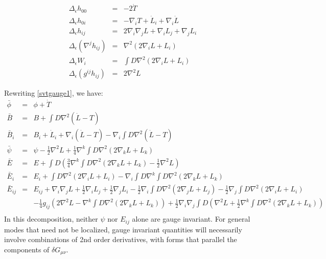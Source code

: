 \documentclass[10pt,letterpaper]{article}
\numberwithin{equation}{section}
\begin{document}
\begin{eqnarray}
\Delta_\epsilon h_{00} &=& -2\dot T
\nonumber\\
\Delta_\epsilon h_{0i} &=& -\nabla_i T + \dot L_i + \nabla_i \dot L
\nonumber\\
\Delta_\epsilon h_{ij} &=& 2\nabla_i\nabla_j L + \nabla_i L_j + \nabla_j L_i 
\nonumber\\
\Delta_\epsilon (\nabla^j h_{ij})&=& \nabla^2(2 \nabla_i L + L_i)
\nonumber\\
\Delta_\epsilon W_i &=& \int D \nabla^2 (2\nabla_i L + L_i)
\nonumber\\
\Delta_\epsilon (g^{ij}h_{ij}) &=& 2\nabla^2 L
\end{eqnarray}

Rewriting \eqref{svtgauge1}, we have:
\begin{eqnarray}
\bar\phi &=& \phi+ \dot T
\label{phisvt}
\\
\bar B &=& B + \int D \nabla^2(\dot L-T)
\\
\label{Bsvt}
\bar B_i &=& B_i + \dot L_i + \nabla_i (\dot L-T) - \nabla_i \int D \nabla^2(\dot L-T)
\\
\label{Bisvt}
\bar\psi&=& \psi -\tfrac12 \nabla^2 L+\tfrac14 \nabla^k \int D \nabla^2 (2\nabla_k L + L_k)
\\
\label{psisvt}
\bar E&=& E + \int D\left(\tfrac34 \nabla^k \int D\nabla^2(2\nabla_k L + L_k) -\tfrac12 \nabla^2 L\right)
\\
\label{Esvt}
\bar E_i &=& E_i + \int D\nabla^2 (2 \nabla_i L + L_i) - \nabla_i \int D \nabla^k \int D\nabla^2 (2 \nabla_k L + L_k)
\\
\label{Eisvt}
\bar E_{ij} &=& E_{ij} +\nabla_i \nabla_j L + \tfrac12\nabla_i L_j+ \tfrac12\nabla_j L_i
-\tfrac12\nabla_i \int D\nabla^2 (2\nabla_j L + L_j) - \tfrac12\nabla_j \int D \nabla^2 (2\nabla_i L + L_i)
\nonumber\\
&&-\tfrac14 g_{ij}\left( 2 \nabla^2 L - \nabla^k \int D \nabla^2( 2\nabla_k L + L_k)\right)
+ \tfrac12 \nabla_i \nabla_j \int D \left( \nabla^2 L +\tfrac12 \nabla^k \int D \nabla^2 (2\nabla_k L +L_k)\right)
\nonumber\\
\label{Etsvt}
\end{eqnarray}
In this decomposition, neither $\psi$ nor $E_{ij}$ alone are gauge invariant. For general modes that need not be localized, gauge invariant quantities will necessarily involve combinations of 2nd order derivatives, with forms that parallel the components of $\delta G_{\mu\nu}$. 
\\ \\
\end{document}
